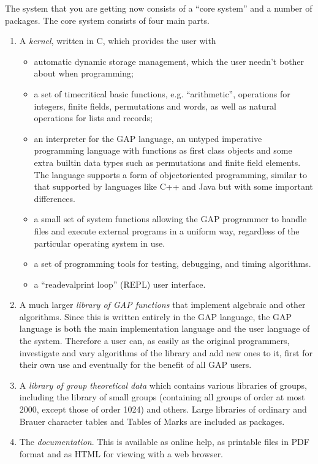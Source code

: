 \documentclass[a4paper,11pt]{report}
\begin{document}
{{ The system that you are getting now consists of a ``core system'' and a number of packages. The core system consists of four main parts. 
\begin{enumerate}
\item  A \emph{kernel}, written in C, which provides the user with 
\begin{itemize}
\item  automatic dynamic storage management, which the user needn't bother about when
programming; 
\item  a set of time\texttt{}critical basic functions, e.g. ``arithmetic'', operations for integers, finite fields, permutations and words, as well as
natural operations for lists and records; 
\item  an interpreter for the \textsf{GAP} language, an untyped imperative programming language with functions as first
class objects and some extra built\texttt{}in data types such as
permutations and finite field elements. The language supports a form of
object\texttt{}oriented programming, similar to that supported by
languages like C++ and Java but with some important differences. 
\item  a small set of system functions allowing the \textsf{GAP} programmer to handle files and execute external programs in a uniform way,
regardless of the particular operating system in use. 
\item  a set of programming tools for testing, debugging, and timing algorithms. 
\item  a ``read\texttt{}eval\texttt{}print loop'' (REPL) user interface. 
\end{itemize}
 
\item  A much larger \emph{library of \textsf{GAP} functions} that implement algebraic and other algorithms. Since this is written entirely
in the \textsf{GAP} language, the \textsf{GAP} language is both the main implementation language and the user language of the
system. Therefore a user can, as easily as the original programmers,
investigate and vary algorithms of the library and add new ones to it, first
for their own use and eventually for the benefit of all \textsf{GAP} users. 
\item  A \emph{library of group theoretical data} which contains various libraries of groups, including the library of small
groups (containing all groups of order at most 2000, except those of order
1024) and others. Large libraries of ordinary and Brauer character tables and
Tables of Marks are included as packages. 
\item  The \emph{documentation}. This is available as on\texttt{}line help, as printable files in
PDF format and as HTML for viewing with a web browser. 
\end{enumerate}
 

}}
\end{document}

